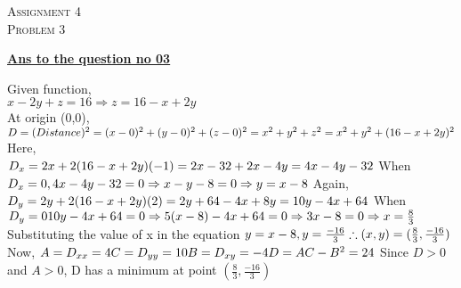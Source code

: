 \documentclass{article}
\begin{document}
\begin{newpage}
    \begin{flushright}
    \textsc{Assignment 4}\\
    \textsc{Problem 3}\\
    [1 cm]
    \end{flushright}
\begin{center}
  \textbf{\Large \underline {Ans to the question no 03}}\\
  [0.5 cm]
\end{center}
\Large {Given function, \\[3mm]
$ x-2y + z = 16
\Rightarrow z=16-x+2y$\\[3mm]
At origin (0,0),\\[3mm]
$D=(Distance)^2=(x-0)^2+(y-0)^2+(z-0)^2\\[3mm]
=x^2+y^2+z^2\\[3mm]
=x^2+y^2+(16-x+2y)^2$\\[3mm]
Here,\\[3mm]
$D_x=2x+2(16-x+2y)(-1)\\[3mm]
=2x-32+2x-4y\\[3mm]
=4x-4y-32\\[3mm]$
When $D_x=0,\\[3mm]
4x-4y-32=0\\[3mm]
\Rightarrow x-y-8=0\\[3mm]
\Rightarrow y=x-8\\[3mm]$
Again,
$D_y=2y+2(16-x+2y)(2)\\[3mm]
=2y+64-4x+8y\\[3mm]
=10y-4x+64\\[3mm]$
When $D_y=0\\[3mm]
10y-4x+64=0\\[3mm]
\Rightarrow 5(x-8)-4x+64=0\\[3mm]
\Rightarrow 3x-8=0 \\[3mm]
\Rightarrow x=\frac{8}{3}\\[3mm]$
Substituting the value of x in the equation $ y=x-8,\\[3mm]
y=\frac{-16}{3}\\[3mm]
\therefore (x,y)=(\frac{8}{3},\frac{-16}{3})\\[3mm]$
Now,
$A=D_{xx}=4\\[3mm]
C=D_{yy}=10\\[3mm]
B=D_{xy}=-4\\[3mm]
D=AC-B^2=24\\[3mm]$
Since $D>0$ and $A>0$, D has a minimum at point $(\frac{8}{3},\frac{-16}{3})$\\[3mm]
}
\end{newpage}
\end{document}
